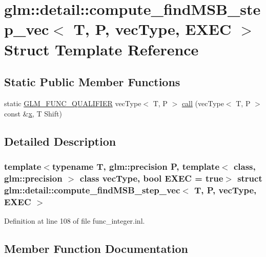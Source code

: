 \hypertarget{structglm_1_1detail_1_1compute__find_m_s_b__step__vec}{}\section{glm\+::detail\+::compute\+\_\+find\+M\+S\+B\+\_\+step\+\_\+vec$<$ T, P, vec\+Type, E\+X\+EC $>$ Struct Template Reference}
\label{structglm_1_1detail_1_1compute__find_m_s_b__step__vec}
\subsection*{Static Public Member Functions}
\begin{DoxyCompactItemize}
\item 
static \mbox{\hyperlink{setup_8hpp_a33fdea6f91c5f834105f7415e2a64407}{G\+L\+M\+\_\+\+F\+U\+N\+C\+\_\+\+Q\+U\+A\+L\+I\+F\+I\+ER}} vec\+Type$<$ T, P $>$ \mbox{\hyperlink{structglm_1_1detail_1_1compute__find_m_s_b__step__vec_af4ab89696a02cfcbc5d96dff9e92521c}{call}} (vec\+Type$<$ T, P $>$ const \&\mbox{\hyperlink{glad_8h_a92d0386e5c19fb81ea88c9f99644ab1d}{x}}, T Shift)
\end{DoxyCompactItemize}


\subsection{Detailed Description}
\subsubsection*{template$<$typename T, glm\+::precision P, template$<$ class, glm\+::precision $>$ class vec\+Type, bool E\+X\+EC = true$>$\newline
struct glm\+::detail\+::compute\+\_\+find\+M\+S\+B\+\_\+step\+\_\+vec$<$ T, P, vec\+Type, E\+X\+E\+C $>$}



Definition at line 108 of file func\+\_\+integer.\+inl.



\subsection{Member Function Documentation}
\mbox{\label{structglm_1_1detail_1_1compute__find_m_s_b__step__vec_af4ab89696a02cfcbc5d96dff9e92521c}} 
